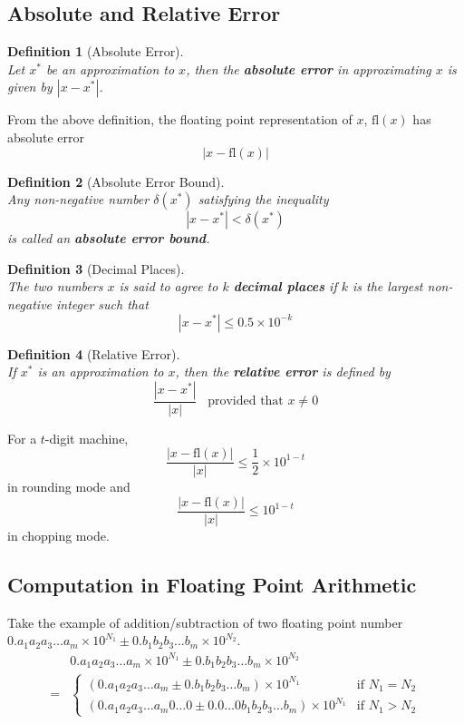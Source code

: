 \documentclass[12pt]{article}
\newtheorem{definition}{Definition}[section]
\theoremstyle{definition}
\newcommand\fl[1]{\text{fl}\left(#1\right)}
\begin{document}
\subsection{Absolute and Relative Error}
\begin{definition}[Absolute Error]
\hfill\\\normalfont Let $x^\ast$ be an approximation to $x$, then the \textbf{absolute error} in approximating $x$ is given by $|x-x^\ast|$.
\end{definition}
From the above definition, the floating point representation of $x$, $\fl{x}$ has absolute error
\[
|x-\fl{x}|
\]
\begin{definition}[Absolute Error Bound]
\hfill\\\normalfont Any non-negative number $\delta(x^\ast)$ satisfying the inequality
\[
|x-x^\ast|<\delta(x^\ast)
\]
is called an \textbf{absolute error bound}.
\end{definition}
\begin{definition}[Decimal Places]
\hfill\\\normalfont The two numbers $x$ is said to agree to $k$ \textbf{decimal places} if $k$ is the largest non-negative integer such that
\[
|x-x^\ast|\leq 0.5\times 10^{-k}
\]
\end{definition}
\begin{definition}[Relative Error]
\hfill\\\normalfont If $x^\ast$ is an approximation to $x$, then the \textbf{relative error} is defined by
\[
\frac{|x-x^\ast|}{|x|}\;\;\;\text{provided that } x\neq 0
\]
\end{definition}
For a $t$-digit machine,
\[
\frac{|x-\fl{x}|}{|x|}\leq \frac{1}{2}\times 10^{1-t}
\]
in rounding mode and
\[
\frac{|x-\fl{x}|}{|x|}\leq 10^{1-t}
\]
in chopping mode.
\subsection{Computation in Floating Point Arithmetic}
Take the example of addition/subtraction of two floating point number $0.a_1a_2a_3\ldots a_m\times 10^{N_1}\pm 0.b_1b_2b_3\ldots b_m\times 10^{N_2}$.
\begin{align*}
&0.a_1a_2a_3\ldots a_m\times 10^{N_1}\pm 0.b_1b_2b_3\ldots b_m\times 10^{N_2}\\
=&\begin{cases}
(0.a_1a_2a_3\ldots a_m\pm 0.b_1b_2b_3\ldots b_m)\times 10^{N_1}&\text{if }N_1= N_2\\
(0.a_1a_2a_3\ldots a_m 0\ldots 0\pm 0.0\ldots 0b_1b_2b_3\ldots b_m)\times 10^{N_1}&\text{if }N_1>N_2
\end{cases}
\end{align*}
\end{document}
